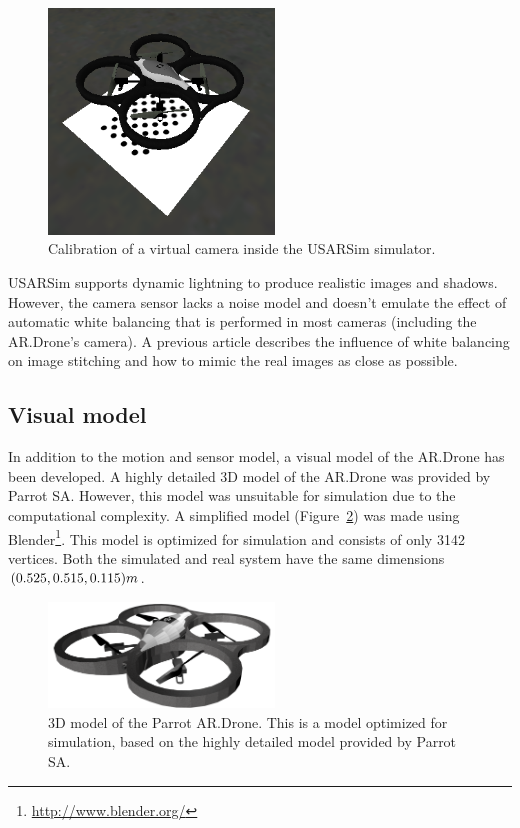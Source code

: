 \begin{figure}[htb!]
\centering
\includegraphics[width=6cm]{images/usarsim_camera_calibration.png}
\caption{Calibration of a virtual camera inside the USARSim simulator.} 
\label{fig:3Dmodel}
\end{figure}

USARSim supports dynamic lightning to produce realistic images and shadows.
However, the camera sensor lacks a noise model and doesn't emulate the effect of automatic white balancing that is performed in most cameras (including the AR.Drone's camera).
A previous article \cite{Visser2011imav} describes the influence of white balancing on image stitching and how to mimic the real images as close as possible.


		\subsection{Visual model}
In addition to the motion and sensor model, a visual model of the AR.Drone has been developed.
A highly detailed 3D model of the AR.Drone was provided by Parrot SA.
However, this model was unsuitable for simulation due to the computational complexity.
A simplified model (Figure~\ref{fig:3Dmodel}) was made using Blender\footnote{\url{http://www.blender.org/}}.
This model is optimized for simulation and consists of only 3142 vertices.
Both the simulated and real system have the same dimensions $(0.525,0.515,0.115)\small{m}$.

\begin{figure}[htb!]
\centering
\includegraphics[width=6cm]{images/ardrone_blender_final.png}
\caption{3D model of the Parrot AR.Drone. This is a model optimized for simulation, based on the highly detailed model provided by Parrot SA.} 
\label{fig:3Dmodel}
\end{figure}


